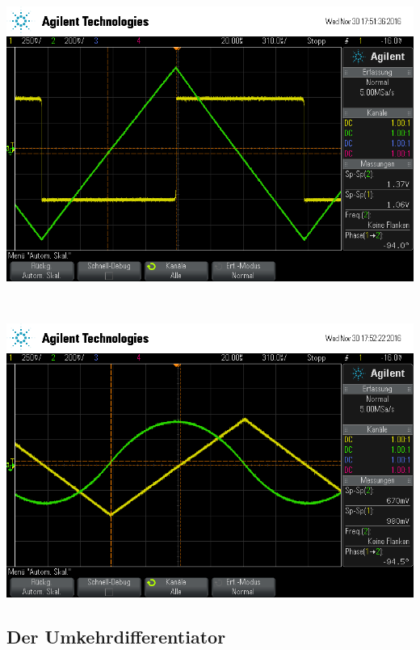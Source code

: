 \documentclass[]{scrartcl}
\begin{document}
\begin{minipage}[t]{0.5\textwidth}
	\includegraphics[width=\textwidth]{images/rechteck_int}
	\label{fig:rechteckint}
\end{minipage} \\
\begin{minipage}[t]{0.5\textwidth}
	\includegraphics[width=\textwidth]{images/dreieck_int}
	\label{fig:dreieckint}
\end{minipage}

\subsection{Der Umkehrdifferentiator}
\end{document}
